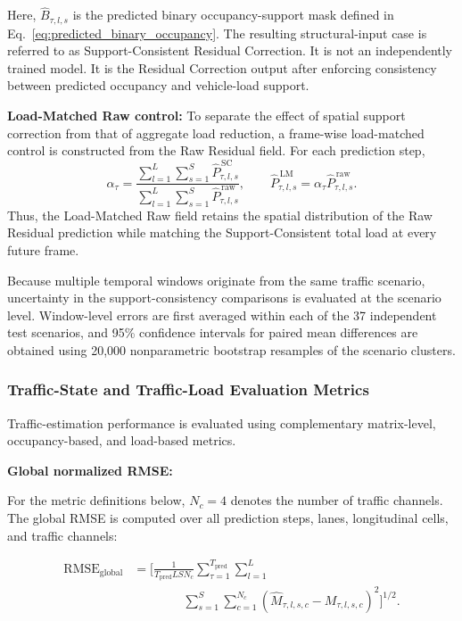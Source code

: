 \documentclass[journal]{IEEEtran}
\begin{document}
Here, $\widehat{B}_{\tau,l,s}$ is the predicted binary occupancy-support mask
defined in Eq.~\eqref{eq:predicted_binary_occupancy}.
The resulting
structural-input case is referred to as Support-Consistent Residual Correction.
It is not an independently trained model. It is the Residual Correction output after enforcing consistency between predicted occupancy and vehicle-load support.

\textbf{Load-Matched Raw control:}
To separate the effect of spatial support correction from that of aggregate load reduction, a frame-wise load-matched control is constructed from the Raw Residual field. For each prediction step,
\begin{equation}
\alpha_{\tau}
=
\frac{
\sum_{l=1}^{L}\sum_{s=1}^{S}
\widehat{P}^{\,\mathrm{SC}}_{\tau,l,s}
}{
\sum_{l=1}^{L}\sum_{s=1}^{S}
\widehat{P}^{\,\mathrm{raw}}_{\tau,l,s}
},
\qquad
\widehat{P}^{\,\mathrm{LM}}_{\tau,l,s}
=
\alpha_{\tau}
\widehat{P}^{\,\mathrm{raw}}_{\tau,l,s}.
\label{eq:load_matched_control}
\end{equation}
Thus, the Load-Matched Raw field retains the spatial distribution of the Raw Residual prediction while matching the Support-Consistent total load at every future frame.

Because multiple temporal windows originate from the same traffic scenario, uncertainty in the support-consistency comparisons is evaluated at the scenario level. Window-level errors are first averaged within each of the 37 independent test scenarios, and 95\% confidence intervals for paired mean differences are obtained using 20,000 nonparametric bootstrap resamples of the scenario clusters.



\subsubsection{Traffic-State and Traffic-Load Evaluation Metrics}

Traffic-estimation
performance is evaluated using complementary matrix-level, occupancy-based, and
load-based metrics.

\textbf{Global normalized RMSE:}

For the metric definitions below, $N_c=4$ denotes the number of traffic channels. The global RMSE is computed over all prediction steps, lanes, longitudinal cells, and traffic channels:

\begin{equation}
\begin{aligned}
\mathrm{RMSE}_{\mathrm{global}}
&=
\Bigg[
\frac{1}
{T_{\mathrm{pred}}LSN_c}
\sum_{\tau=1}^{T_{\mathrm{pred}}}
\sum_{l=1}^{L}
\\
&\qquad\qquad
\sum_{s=1}^{S}
\sum_{c=1}^{N_c}
\left(
\widehat{M}_{\tau,l,s,c}
-
M_{\tau,l,s,c}
\right)^2
\Bigg]^{1/2}.
\end{aligned}
\end{equation}
\end{document}
